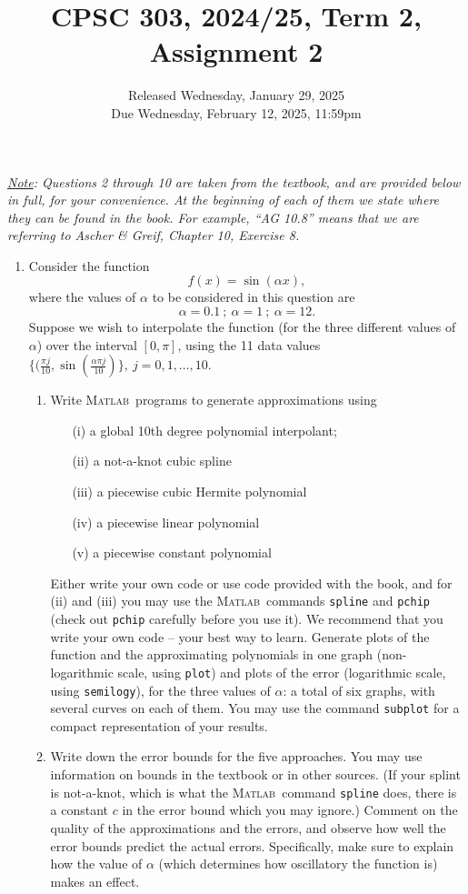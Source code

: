 \documentclass[11pt]{article}
\title{CPSC 303, 2024/25, Term 2, Assignment 2}
\author{Released Wednesday, January 29, 2025 \\
Due Wednesday, February  12, 2025, 11:59pm}
\date{}
\newcommand{\matlab}{\textsc{Matlab\ }}
\begin{document}
\maketitle 
\thispagestyle{empty}
\noindent
{\em {\underline {Note}}: Questions 2 through 10 are taken from the textbook, and are provided below in full, for your convenience. At the beginning of each of them we state where they can be found  in the book. For example, ``AG 10.8'' means that we are referring to Ascher \& Greif, Chapter 10, Exercise 8.}

\begin{enumerate}

\item Consider the function $$f(x) = \sin (\alpha x), $$ where the values
of $\alpha$ to be considered in this question are
$$ \alpha = 0.1 \ ; \  \alpha=1\ ;  \
\alpha=12.$$ Suppose we wish to interpolate the function (for the
three different values of $\alpha$) over the interval $[0,\pi]$,
using the 11 data values $\{ (\frac{\pi j}{10},\sin (\frac{\alpha
\pi j}{10}) \},\ j=0,1,\dots,10.$

\begin{enumerate}
\item Write \matlab programs to generate approximations using
\begin{enumerate}
\item[(i)] a global 10th degree polynomial interpolant;
\item[(ii)] a not-a-knot cubic spline
\item[(iii)] a piecewise cubic Hermite polynomial
\item[(iv)] a piecewise linear polynomial
\item[(v)] a piecewise constant polynomial
\end{enumerate}
Either write your own code or use code provided with the book, and for (ii) and (iii) you may use the \matlab commands {\tt spline} and {\tt pchip} (check out {\tt pchip} carefully before you use it). We recommend that you write your own code -- your best way to learn.
Generate plots of the function and the approximating polynomials in
one graph (non-logarithmic scale, using {\tt plot}) and plots of the
error (logarithmic scale, using {\tt semilogy}), for the three
values of $\alpha$: a total of six graphs, with several curves on each of them. You may use the command
{\tt subplot} for a compact representation of your results.
\item Write down the error bounds for the five approaches. You may use information on bounds in the textbook or in other sources. (If your splint is not-a-knot, which is what the \matlab command {\tt spline} does, there is a constant $c$ in the error bound which you may ignore.) Comment on the quality of the approximations and the errors, and observe how well the error bounds predict the
actual errors. Specifically, make sure to explain how the value of
$\alpha$ (which determines how oscillatory the function is) makes an
effect.
\end{enumerate}


\end{enumerate}
\end{document}
